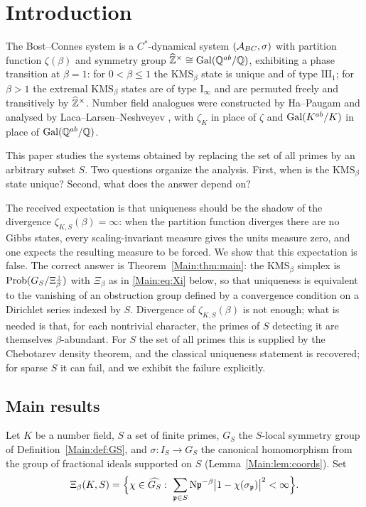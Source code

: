 \section{Introduction}

The Bost--Connes system \cite{BC} is a $C^*$-dynamical system
$(\mathcal{A}_{BC},\sigma)$ with partition function $\zeta(\beta)$ and symmetry group
$\widehat{\mathbb{Z}}^\times\cong\operatorname{Gal}(\mathbb{Q}^{ab}/\mathbb{Q})$, exhibiting a phase transition at $\beta=1$:
for $0<\beta\le1$ the $\mathrm{KMS}_\beta$ state is unique and of type
$\mathrm{III}_1$; for $\beta>1$ the extremal $\mathrm{KMS}_\beta$ states are of
type $\mathrm I_\infty$ and are permuted freely and transitively by
$\widehat{\mathbb{Z}}^\times$. Number field analogues were constructed by Ha--Paugam \cite{HP}
and analysed by Laca--Larsen--Neshveyev \cite{LLN}, with $\zeta_K$ in place of
$\zeta$ and $\operatorname{Gal}(K^{ab}/K)$ in place of $\operatorname{Gal}(\mathbb{Q}^{ab}/\mathbb{Q})$.

This paper studies the systems obtained by replacing the set of all primes by
an arbitrary subset $S$. Two questions organize the analysis. First, when is
the $\mathrm{KMS}_\beta$ state unique? Second, what does the answer depend on?

The received expectation is that uniqueness should be the shadow of the
divergence $\zeta_{K,S}(\beta)=\infty$: when the partition function diverges
there are no Gibbs states, every scaling-invariant measure gives the units
measure zero, and one expects the resulting measure to be forced. We show that
this expectation is false. The correct answer is Theorem~\ref{Main:thm:main}: the
$\mathrm{KMS}_\beta$ simplex is $\mathrm{Prob}(G_S/\Xi_\beta^\perp)$ with $\Xi_\beta$
as in \eqref{Main:eq:Xi} below, so that uniqueness is equivalent to the vanishing of
an obstruction group defined by a convergence condition on a Dirichlet series
indexed by $S$. Divergence of $\zeta_{K,S}(\beta)$ is not enough; what is
needed is that, for each nontrivial character, the primes of $S$ detecting it
are themselves $\beta$-abundant. For $S$ the set of all primes this is supplied
by the Chebotarev density theorem, and the classical uniqueness statement is
recovered; for sparse $S$ it can fail, and we exhibit the failure explicitly.

\subsection*{Main results}

Let $K$ be a number field, $S$ a set of finite primes, $G_S$ the $S$-local
symmetry group of Definition~\ref{Main:def:GS}, and $\sigma:I_S\to G_S$ the
canonical homomorphism from the group of fractional ideals supported on $S$
(Lemma~\ref{Main:lem:coords}). Set
\begin{equation}\label{Main:eq:Xi}
\Xi_\beta(K,S)=\Bigl\{\chi\in\widehat{G_S}:\ \sum_{\mathfrak{p}\in S}\mathrm{N}\mathfrak{p}^{-\beta}\bigl|1-\chi(\sigma_{\mathfrak{p}})\bigr|^2<\infty\Bigr\}.
\end{equation}

